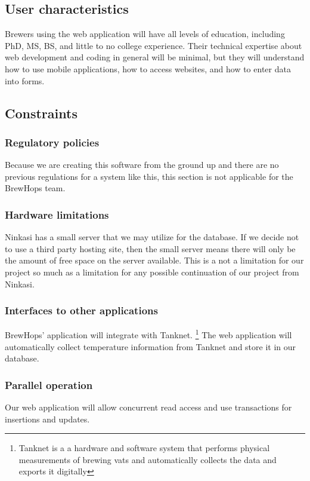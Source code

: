 \documentclass[draftclsnofoot,onecolumn,letterpaper,10pt,compsoc]{IEEEtran}
\begin{document}
	\subsection{User characteristics}
		Brewers using the web application will have all levels of education, including PhD, MS, BS, and little to no college experience.
		Their technical expertise about web development and coding in general will be minimal, but they will understand how to use mobile applications, how to access websites, and how to enter data into forms.

	\subsection{Constraints}
		\subsubsection{Regulatory policies}
		Because we are creating this software from the ground up and there are no previous regulations for a system like this, this section is not applicable for the BrewHops team.

		\subsubsection{Hardware limitations}
		Ninkasi has a small server that we may utilize for the database.
		If we decide not to use a third party hosting site, then the small server means there will only be the amount of free space on the server available.
		This is a not a limitation for our project so much as a limitation for any possible continuation of our project from Ninkasi.

		\subsubsection{Interfaces to other applications}
		BrewHops’ application will integrate with Tanknet.
		\footnote{Tanknet is a a hardware and software system that performs physical measurements of brewing vats and automatically collects the data and exports it digitally}
		The web application will automatically collect temperature information from Tanknet and store it in our database.

		\subsubsection{Parallel operation}
        Our web application will allow concurrent read access and use transactions for insertions and updates.
\end{document}
